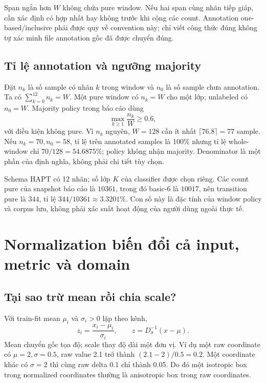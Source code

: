 \documentclass[11pt,a4paper]{article}
\theoremstyle{definition}
\begin{document}
Span ngắn hơn $W$ không chứa pure window. Nếu hai span cùng nhãn tiếp giáp,
cần xác định có hợp nhất hay không trước khi cộng các count. Annotation
one-based/inclusive phải được quy về convention này; chỉ viết công thức
đúng không tự xác minh file annotation gốc đã được chuyển đúng.

\subsection{Tỉ lệ annotation và ngưỡng majority}
Đặt $n_k$ là số sample có nhãn $k$ trong window và $n_0$ là số sample chưa
annotation. Ta có $\sum_{k=0}^{12}n_k=W$. Một pure window có $n_k=W$ cho
một lớp; unlabeled có $n_0=W$. Majority policy trong báo cáo dùng
\begin{equation}
\max_{k\ge1}\frac{n_k}{W}\ge0.6,
\end{equation}
với điều kiện không pure. Vì $n_k$ nguyên, $W=128$ cần ít nhất
$\lceil76.8\rceil=77$ sample. Nếu $n_k=70,n_0=58$, tỉ lệ trên annotated
samples là 100\% nhưng tỉ lệ whole-window chỉ $70/128=54.6875\%$; policy
không nhận majority. Denominator là một phần của định nghĩa, không phải
chi tiết tùy chọn.

Schema HAPT có 12 nhãn; số lớp $K$ của classifier được chọn riêng. Các
count pure của snapshot báo cáo là $10361$, trong đó basic-6 là $10017$,
nên transition pure là $344$, tỉ lệ $344/10361\approx3.3201\%$. Con số này
là đặc tính của window policy và corpus lưu, không phải xác suất hoạt động
của người dùng ngoài thực tế.

\section{Normalization biến đổi cả input, metric và domain}
\subsection{Tại sao trừ mean rồi chia scale?}
Với train-fit mean $\mu_i$ và $\sigma_i>0$ lặp theo kênh,
\begin{equation}
z_i=\frac{x_i-\mu_i}{\sigma_i},\qquad
z=D_\sigma^{-1}(x-\mu).
\label{eq:normalization}
\end{equation}
Mean chuyển gốc tọa độ; scale thay độ dài một đơn vị. Ví dụ một raw coordinate
có $\mu=2,\sigma=0.5$, raw value 2.1 trở thành $(2.1-2)/0.5=0.2$.
Một coordinate khác có $\sigma=2$ thì cùng raw delta 0.1 chỉ thành 0.05.
Do đó một isotropic box trong normalized coordinates thường là anisotropic
box trong raw coordinates.
\end{document}
